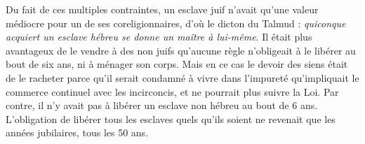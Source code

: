  Du fait de ces multiples contraintes, un esclave juif n'avait qu'une valeur médiocre pour un de ses coreligionnaires, d'où le dicton du Talmud : {\emph{quiconque acquiert un esclave hébreu se donne un maître à lui-même}}. Il était plus avantageux de le vendre à des non juifs qu'aucune règle n'obligeait à le libérer au bout de six ans, ni à ménager son corps. Mais en ce cas le devoir des siens était de le racheter parce qu'il serait condamné à vivre dans l'impureté qu'impliquait le commerce continuel avec les incirconcis, et ne pourrait plus suivre la Loi. Par contre, il n'y avait pas à libérer un esclave non hébreu au bout de 6 ans. L'obligation de libérer tous les esclaves quels qu'ils soient ne revenait que les années jubilaires, tous les 50 ans.

 
